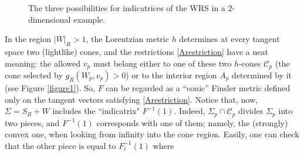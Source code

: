 \documentclass[reqno,10pt]{amsart}
\newcommand{\C}{\mathcal{C}}
\begin{document}
 \begin{figure}
\caption{\label{figureindic}The three possibilities for indicatrices of the WRS in a $2$-dimensional example.}
\end{figure}
 In the region 
$|W|_R>1$, the Lorentzian metric $h$ determines  at every tangent space  two (lightlike) cones, and the restrictions \eqref{Arestriction} have
a neat meaning: the allowed $v_p$ must belong  either to one of these two $h$-cones $\C_p$ (the cone selected by $g_R(W_p,v_p)>0$) or to the interior 
region $A_p$ determined by it  (see Figure \ref{figure1}).  So, $F$ can be regarded as a ``conic'' Finsler 
metric defined only on the tangent vectors satisfying 
\eqref{Arestriction}. Notice that, now, 
$\Sigma=S_R+W$ includes the ``indicatrix" $F^{-1}(1)$. Indeed, $
\Sigma_p \cap \C_p$ divides $\Sigma_p$  into  two pieces, and $F^{-1}(1)$ corresponds with one of them; namely, the (strongly) convex one, when looking from infinity into the cone region. Easily, one can check that the other piece is equal to $F_l^{-1}(1)$ where 
\end{document}
